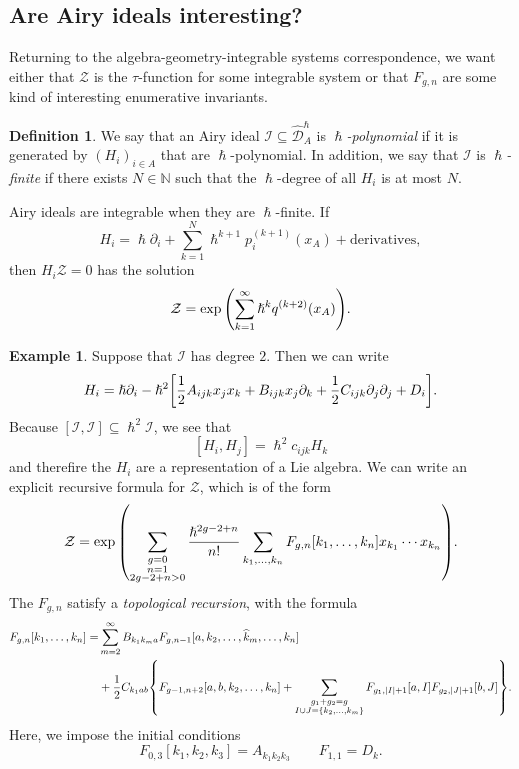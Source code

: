 \documentclass[leqno, openany]{memoir}
\theoremstyle{definition}
\newtheorem{defn}[thm]{Definition}
\newtheorem{exm}[thm]{Example}
\theoremstyle{remark}
\theoremstyle{plain}
\theoremstyle{definition}
\theoremstyle{remark}
\newcommand{\mc}[1]{\mathcal{#1}}
\newcommand{\mr}[1]{\mathrm{#1}}
\newcommand{\wh}[1]{\widehat{#1}}
\begin{document}
\subsection{Are Airy ideals interesting?}

Returning to the algebra-geometry-integrable systems correspondence, we want either that $\mc{Z}$ is the $\tau$-function for some integrable system or that $F_{g,n}$ are some kind of interesting enumerative invariants.

\begin{defn}
    We say that an Airy ideal $\mc{I} \subseteq \wh{\mc{D}}_A^{\hslash}$ is \textit{$\hslash$-polynomial} if it is generated by $(H_i)_{i \in A}$ that are $\hslash$-polynomial. In addition, we say that $\mc{I}$ is \textit{$\hslash$-finite} if there exists $N \in \mathbb{N}$ such that the $\hslash$-degree of all $H_i$ is at most $N$.
\end{defn}

Airy ideals are integrable when they are $\hslash$-finite. If
\[ H_i = \hslash \partial_i + \sum_{k=1}^N \hslash^{k+1} p_i^{(k+1)}(x_A) + \mr{derivatives}, \]
then $H_i \mc{Z} = 0$ has the solution
\[ \mc{Z} = \exp\qty(\sum_{k=1}^{\infty} \hslash^k q^{(k+2)}(x_A)). \]

\begin{exm}
    Suppose that $\mc{I}$ has degree $2$. Then we can write
    \[ H_i = \hslash \partial_i - \hslash^2 \qty[\frac{1}{2} A_{ijk} x_j x_k + B_{ijk} x_j \partial_k + \frac{1}{2} C_{ijk} \partial_j \partial_j + D_i]. \]
    Because $[\mc{I}, \mc{I}] \subseteq \hslash^2 \mc{I}$, we see that
    \[ [H_i, H_j] = \hslash^2 c_{ijk} H_k \]
    and therefire the $H_i$ are a representation of a Lie algebra. We can write an explicit recursive formula for $\mc{Z}$, which is of the form
    \[ \mc{Z} = \exp \qty(\sum_{\substack{g=0 \\ n=1 \\ 2g-2+n > 0}} \frac{\hslash^{2g-2+n}}{n!} \sum_{k_1, \ldots, k_n} F_{g,n}[k_1, \ldots, k_n] x_{k_1} \cdots x_{k_n}). \]
    The $F_{g,n}$ satisfy a \textit{topological recursion}, with the formula
    \begin{align*}
        F_{g,n}[k_1, \ldots, k_n] =&{} \sum_{m=2}^{\infty} B_{k_1k_ma} F_{g, n-1}[a, k_2, \ldots, \wh{k}_m, \ldots, k_n] \\
        &+ \frac{1}{2} C_{k_1 ab} \qty{F_{g-1,n+2}[a,b,k_2,\ldots,k_n] + \sum_{\substack{g_1+g_2=g \\ I \cup J = \qty{k_2,\ldots,k_m}}} F_{g_1,\abs{I}+1}[a, I] F_{g_2,\abs{J}+1}[b, J]}.
    \end{align*}
    Here, we impose the initial conditions
    \[ F_{0,3}[k_1, k_2, k_3] = A_{k_1 k_2 k_3} \qquad F_{1,1} = D_k. \]
\end{exm}
\end{document}
